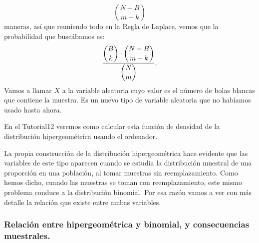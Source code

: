 \[\binom{N-B}{m-k}\]
maneras, así que reuniendo todo en la Regla de Laplace, vemos que la probabilidad que buscábamos es:
\[\dfrac{\dbinom{B}{k}\cdot\dbinom{N-B}{m-k}}{\dbinom{N}{m}}.\]
Vamos a llamar $X$ a la variable aleatoria cuyo valor es el número de bolas blancas que contiene la muestra. Es un nuevo tipo de variable aleatoria que no habíamos usado hasta ahora.
\begin{center}
    \end{center}
En el Tutorial12 veremos como calcular esta función de densidad de la distribución hipergeométrica usando el ordenador.

La propia construcción de la distribución hipergeométrica hace evidente que las variables de este tipo aparecen cuando se estudia la distribución muestral de una proporción en una población, al tomar muestras sin reemplazamiento. Como hemos dicho, cuando las muestras se toman con reemplazamiento, este mismo problema conduce a la distribución binomial. Por esa razón vamos a ver con más detalle la relación que existe entre ambas variables.

\subsubsection{Relación entre hipergeométrica y binomial, y consecuencias muestrales.}

